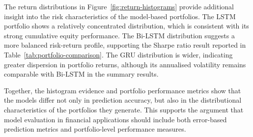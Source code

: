 The return distributions in Figure~\ref{fig:return-histograms} provide additional insight into the risk characteristics of the model-based portfolios. The LSTM portfolio shows a relatively concentrated distribution, which is consistent with its strong cumulative equity performance. The Bi-LSTM distribution suggests a more balanced risk-return profile, supporting the Sharpe ratio result reported in Table~\ref{tab:portfolio-comparison}. The GRU distribution is wider, indicating greater dispersion in portfolio returns, although its annualised volatility remains comparable with Bi-LSTM in the summary results.

Together, the histogram evidence and portfolio performance metrics show that the models differ not only in prediction accuracy, but also in the distributional characteristics of the portfolios they generate. This supports the argument that model evaluation in financial applications should include both error-based prediction metrics and portfolio-level performance measures.
